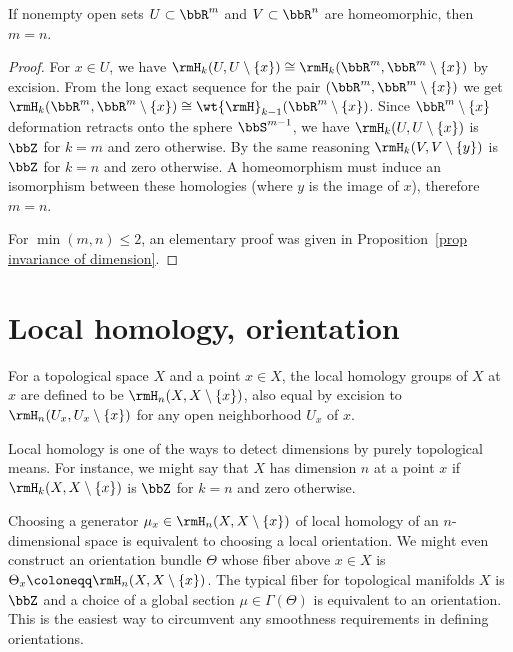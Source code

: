 \begin{cor}\label{cor invariance of dimension}
    If nonempty open sets $U\subset \bbR^m$ and $V\subset \bbR^n$ are homeomorphic, then $m=n$.
\end{cor}
\begin{proof}
     For $x\in U$, we have $\rmH_k(U,U\setminus \{x\})\cong \rmH_k(\bbR^m,\bbR^m\setminus \{x\})$ by excision. From the long exact sequence for the pair $(\bbR^m,\bbR^m\setminus\{x\})$ we get $\rmH_k(\bbR^m,\bbR^m\setminus\{x\})\cong \wt{\rmH}_{k-1}(\bbR^m\setminus\{x\})$. Since $\bbR^m\setminus\{x\}$ deformation retracts onto the sphere $\bbS^{m-1}$, we have $\rmH_k(U,U\setminus\{x\})$ is $\bbZ$ for $k=m$ and zero otherwise. By the same reasoning $\rmH_k(V,V\setminus\{y\})$ is $\bbZ$ for $k=n$ and zero otherwise. A homeomorphism must induce an isomorphism between these homologies (where $y$ is the image of $x$), therefore $m=n$.

     For $\min(m,n)\leq2$, an elementary proof was given in Proposition~\ref{prop invariance of dimension}.
\end{proof}





\section{Local homology, orientation}

\begin{defn}
    For a topological space $X$ and a point $x\in X$, the local homology groups of $X$ at $x$ are defined to be $\rmH_n(X,X\setminus\{x\})$, also equal by excision to $\rmH_n(U_x,U_x\setminus\{x\})$ for any open neighborhood $U_x$ of $x$.
\end{defn}

\begin{rem}
    Local homology is one of the ways to detect dimensions by purely topological means. For instance, we might say that $X$ has dimension $n$ at a point $x$ if $\rmH_k(X,X\setminus\{x\})$ is $\bbZ$ for $k=n$ and zero otherwise.
    
    Choosing a generator $\mu_x\in \rmH_n(X,X\setminus\{x\}) $ of local homology of an $n$-dimensional space is equivalent to choosing a local orientation. We might even construct an orientation bundle $\Theta$ whose fiber above $x\in X$ is $\Theta_x\coloneqq \rmH_n(X,X\setminus\{x\})$. The typical fiber for topological manifolds $X$ is $\bbZ$ and a choice of a global section $\mu\in\Gamma(\Theta)$ is equivalent to an orientation. This is the easiest way to circumvent any smoothness requirements in defining orientations.
\end{rem}

